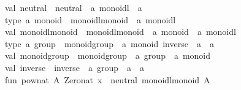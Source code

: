 \begin{isabellebody}
\begin{isamarkuptext}
val\ neutral\ {}\ {}neutral\ {}\ {}a\ monoidl\ {}{}\ {}a{}\isanewline
\isanewline
type\ {}a\ monoid\ {}\ {}monoidl{}monoid\ {}\ {}a\ monoidl{}{}\isanewline
val\ monoidl{}monoid\ {}\ {}monoidl{}monoid\ {}\ {}a\ monoid\ {}{}\ {}a\ monoidl{}\isanewline
\isanewline
type\ {}a\ group\ {}\ {}monoid{}group\ {}\ {}a\ monoid{}\ inverse\ {}\ {}a\ {}{}\ {}a{}{}\isanewline
val\ monoid{}group\ {}\ {}monoid{}group\ {}\ {}a\ group\ {}{}\ {}a\ monoid{}\isanewline
val\ inverse\ {}\ {}inverse\ {}\ {}a\ group\ {}{}\ {}a\ {}{}\ {}a{}\isanewline
\isanewline
fun\ pow{}nat\ A{}\ Zero{}nat\ x\ {}\ neutral\ {}monoidl{}monoid\ A{}{}\isanewline

\end{isamarkuptext}
\end{isabellebody}

